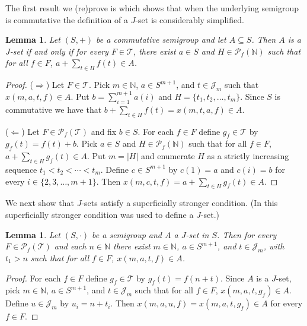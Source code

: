 \documentclass[12pt,showtrims]{memoir}
\theoremstyle{plain}
\newtheorem{lem}[thm]{Lemma}
\theoremstyle{definition}
\newcommand{\bbN}{\mathbb{N}}
\newcommand{\calJ}{\mathcal{J}}
\newcommand{\calT}{\mathcal{T}}
\newcommand{\Pf}{\mathcal{P}_f}
\begin{document}
The first result we (re)prove is \cite[Lemma 2.4]{Hindman:2010fk} which shows that when the underlying semigroup is commutative the definition of a $J$-set is considerably simplified. 

\begin{lem}
  \label{lem:comm-jsets}
  Let $(S, +)$ be a commutative semigroup and let $A \subseteq S$. 
  Then $A$ is a $J$-set if and only if for every $F \in \calT$, there exist $a \in S$ and $H \in \Pf(\bbN)$ such that for all $f \in F$, $a + \sum_{t \in H} f(t) \in A$.
\end{lem}
\begin{proof}
  ($\Rightarrow$)
  Let $F \in \calT$.
  Pick $m \in \bbN$, $a \in S^{m+1}$, and $t \in \calJ_m$ such that $x(m, a, t, f) \in A$.
  Put $b = \sum_{i=1}^{m+1} a(i)$ and $H = \{t_1, t_2, \ldots, t_m\}$.
  Since $S$ is commutative we have that $b + \sum_{t \in H} f(t) = x(m, t, a, f) \in A$.

  ($\Leftarrow$)
  Let $F \in \Pf(\calT)$ and fix $b \in S$.
  For each $f \in F$ define $g_f \in \calT$ by $g_f(t) = f(t)+b$. 
  Pick $a \in S$ and $H \in \Pf(\bbN)$ such that for all $f \in F$, $a + \sum_{t \in H} g_f(t) \in A$. 
  Put $m = |H|$ and enumerate $H$ as a strictly increasing sequence $t_1 < t_2 < \cdots < t_m$. 
  Define $c \in S^{m+1}$ by $c(1) = a$ and $c(i) = b$ for every $i \in \{2, 3, \ldots, m+1\}$.
  Then $x(m, c, t, f) = a + \sum_{t \in H} g_f(t) \in A$.
\end{proof}

We next show that $J$-sets satisfy a superficially stronger condition. 
(In \cite[Definition 3.3(e)]{De:2008uq} this superficially stronger condition was used to define a $J$-set.)

\begin{lem}
  \label{lem:jset-start}
  Let $(S, \cdot)$ be a semigroup and $A$ a $J$-set in $S$.
  Then for every $F \in \Pf(\calT)$ and each $n \in \bbN$ there exist $m \in \bbN$, $a \in S^{m+1}$, and $t \in \calJ_m$, with $t_1 > n$ such that for all $f \in F$, $x(m, a, t, f) \in A$.
\end{lem}
\begin{proof}
  For each $f \in F$ define $g_f \in \calT$ by $g_f(t) = f(n+t)$.
  Since $A$ is a $J$-set, pick $m \in \bbN$, $a \in S^{m+1}$, and $t \in \calJ_m$ such that for all $f \in F$, $x(m, a, t, g_f) \in A$. 
  Define $u \in \calJ_m$ by $u_i =  n + t_i$.
  Then $x(m, a, u, f) = x(m, a, t, g_f) \in A$ for every $f \in F$.
\end{proof}
\end{document}
